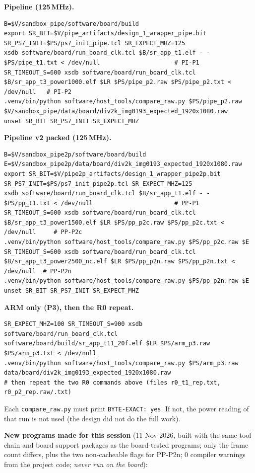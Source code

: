 \documentclass[11pt,a4paper]{article}
\begin{document}
\textbf{Pipeline (125\,MHz).}
\begin{lstlisting}
B=$V/sandbox_pipe/software/board/build
export SR_BIT=$V/pipe_artifacts/design_1_wrapper_pipe.bit SR_PS7_INIT=$PS/ps7_init_pipe.tcl SR_EXPECT_MHZ=125
xsdb software/board/run_board_clk.tcl $B/sr_app_t1.elf - - $PS/pipe_t1.txt < /dev/null                     # PI-P1
SR_TIMEOUT_S=600 xsdb software/board/run_board_clk.tcl $B/sr_app_t3_power1000.elf $LR $PS/pipe_p2.raw $PS/pipe_p2.txt < /dev/null   # PI-P2
.venv/bin/python software/host_tools/compare_raw.py $PS/pipe_p2.raw $V/sandbox_pipe/data/board/div2k_img0193_expected_1920x1080.raw
unset SR_BIT SR_PS7_INIT SR_EXPECT_MHZ
\end{lstlisting}

\textbf{Pipeline v2 packed (125\,MHz).}
\begin{lstlisting}
B=$V/sandbox_pipe2p/software/board/build
E=$V/sandbox_pipe2p/data/board/div2k_img0193_expected_1920x1080.raw
export SR_BIT=$V/pipe2p_artifacts/design_1_wrapper_pipe2p.bit SR_PS7_INIT=$PS/ps7_init_pipe2p.tcl SR_EXPECT_MHZ=125
xsdb software/board/run_board_clk.tcl $B/sr_app_t1.elf - - $PS/pp_t1.txt < /dev/null                       # PP-P1
SR_TIMEOUT_S=600 xsdb software/board/run_board_clk.tcl $B/sr_app_t3_power1500.elf $LR $PS/pp_p2c.raw $PS/pp_p2c.txt < /dev/null     # PP-P2c
.venv/bin/python software/host_tools/compare_raw.py $PS/pp_p2c.raw $E
SR_TIMEOUT_S=600 xsdb software/board/run_board_clk.tcl $B/sr_app_t3_power2500_nc.elf $LR $PS/pp_p2n.raw $PS/pp_p2n.txt < /dev/null  # PP-P2n
.venv/bin/python software/host_tools/compare_raw.py $PS/pp_p2n.raw $E
unset SR_BIT SR_PS7_INIT SR_EXPECT_MHZ
\end{lstlisting}

\textbf{ARM only (P3), then the R0 repeat.}
\begin{lstlisting}
SR_EXPECT_MHZ=100 SR_TIMEOUT_S=900 xsdb software/board/run_board_clk.tcl software/board/build/sr_app_t11_20f.elf $LR $PS/arm_p3.raw $PS/arm_p3.txt < /dev/null
.venv/bin/python software/host_tools/compare_raw.py $PS/arm_p3.raw data/board/div2k_img0193_expected_1920x1080.raw
# then repeat the two R0 commands above (files r0_t1_rep.txt, r0_p2_rep.raw/.txt)
\end{lstlisting}

Each \texttt{compare\_raw.py} must print \texttt{BYTE-EXACT: yes}. If not, the power reading of that run is not used (the design did not do the full work).

\textbf{New programs made for this session} (11 Nov 2026, built with the same tool chain and board support packages as the board-tested programs; only the frame count differs, plus the two non-cacheable flags for PP-P2n; 0 compiler warnings from the project code; \emph{never run on the board}):
\end{document}
